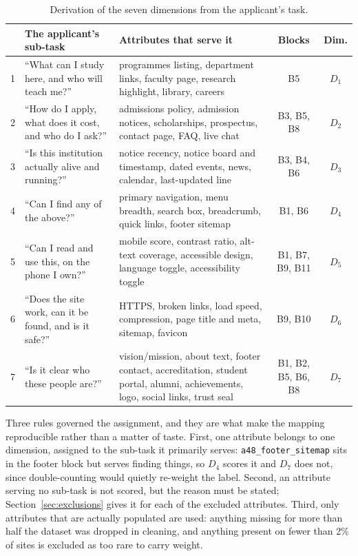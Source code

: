 \documentclass[11pt,a4paper]{article}
\begin{document}
\begin{table}[H]\centering\small
\caption{Derivation of the seven dimensions from the applicant's task.}
\begin{tabular}{cp{4.15cm}p{5.15cm}cc}
\toprule
& \textbf{The applicant's sub-task} & \textbf{Attributes that serve it} & \textbf{Blocks} & \textbf{Dim.} \\
\midrule
1 & ``What can I study here, and who will teach me?'' & programmes listing, department links,
faculty page, research highlight, library, careers & B5 & $D_1$ \\[2pt]
2 & ``How do I apply, what does it cost, and who do I ask?'' & admissions policy, admission notices,
scholarships, prospectus, contact page, FAQ, live chat & B3, B5, B8 & $D_2$ \\[2pt]
3 & ``Is this institution actually alive and running?'' & notice recency, notice board and timestamp,
dated events, news, calendar, last-updated line & B3, B4, B6 & $D_3$ \\[2pt]
4 & ``Can I find any of the above?'' & primary navigation, menu breadth, search box, breadcrumb,
quick links, footer sitemap & B1, B6 & $D_4$ \\[2pt]
5 & ``Can I read and use this, on the phone I own?'' & mobile score, contrast ratio, alt-text
coverage, accessible design, language toggle, accessibility toggle & B1, B7, B9, B11 & $D_5$ \\[2pt]
6 & ``Does the site work, can it be found, and is it safe?'' & HTTPS, broken links, load speed,
compression, page title and meta, sitemap, favicon & B9, B10 & $D_6$ \\[2pt]
7 & ``Is it clear who these people are?'' & vision/mission, about text, footer contact,
accreditation, student portal, alumni, achievements, logo, social links, trust seal &
B1, B2, B5, B6, B8 & $D_7$ \\
\bottomrule
\end{tabular}
\end{table}

\noindent Three rules governed the assignment, and they are what make the mapping reproducible
rather than a matter of taste. First, one attribute belongs to one dimension, assigned to the
sub-task it primarily serves: \texttt{a48\_footer\_sitemap} sits in the footer block but serves
finding things, so $D_4$ scores it and $D_7$ does not, since double-counting would quietly re-weight
the label. Second, an attribute serving no sub-task is not scored, but the reason must be stated;
Section~\ref{sec:exclusions} gives it for each of the \nUnscored{} excluded attributes. Third, only
attributes that are actually populated are used: anything missing for more than half the dataset was
dropped in cleaning, and anything present on fewer than 2\% of sites is excluded as too rare to
carry weight.
\end{document}
